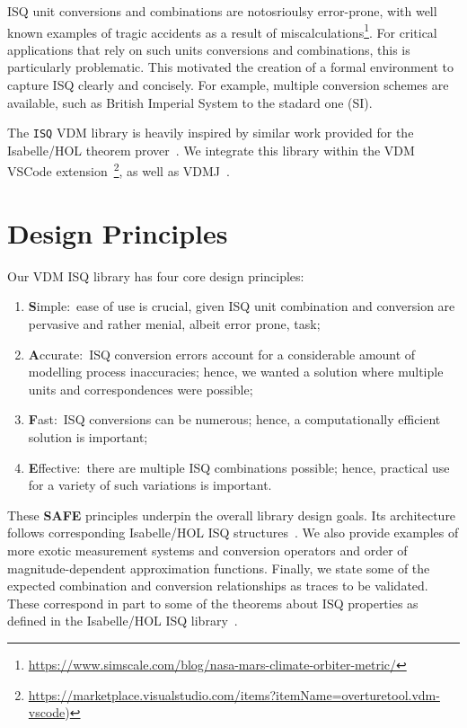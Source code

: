 \documentclass[runningheads,a4paper]{llncs}
\begin{document}
\gls{ISQ} unit conversions and combinations are notosrioulsy error-prone, with well known examples of tragic accidents as a result of miscalculations\footnote{\url{https://www.simscale.com/blog/nasa-mars-climate-orbiter-metric/}}. For critical applications that rely on such units conversions and combinations, this is particularly problematic. This motivated the creation of a formal environment to capture ISQ clearly and concisely. For example, multiple conversion schemes are available, such as British Imperial System to the stadard one (SI).       

The \texttt{ISQ} VDM library is heavily inspired by similar work provided for the Isabelle/HOL theorem prover~\cite{Physical_Quantities-AFP}. We integrate this library within the VDM VSCode extension~\footnote{\url{https://marketplace.visualstudio.com/items?itemName=overturetool.vdm-vscode})}, as well as VDMJ~\cite{Battle09}.


\section{Design Principles}\label{sec:principles}

Our VDM ISQ library has four core design principles:

	\begin{enumerate}
		\item \textbf{S}imple:~ease of use is crucial, given ISQ unit combination and conversion are pervasive and rather menial, albeit error prone, task;
		 
		\item \textbf{A}ccurate:~ISQ conversion errors account for a considerable amount of modelling process inaccuracies; hence, we wanted a solution where multiple units and correspondences were possible;
		 
		\item \textbf{F}ast:~ISQ conversions can be numerous; hence, a computationally efficient solution is important;
		 
		\item \textbf{E}ffective:~there are multiple ISQ combinations possible; hence, practical use for a variety of such variations is important.   
	\end{enumerate}
        
These \textbf{SAFE} principles underpin the overall library design goals. Its architecture follows corresponding Isabelle/HOL ISQ structures~\cite{Physical_Quantities-AFP}. We also provide examples of more exotic measurement systems and conversion operators and order of magnitude-dependent approximation functions. Finally, we state some of the expected combination and conversion relationships as traces to be validated. These correspond in part to some of the theorems about ISQ properties as defined in the Isabelle/HOL ISQ library~\cite{Physical_Quantities-AFP}.   
\end{document}
